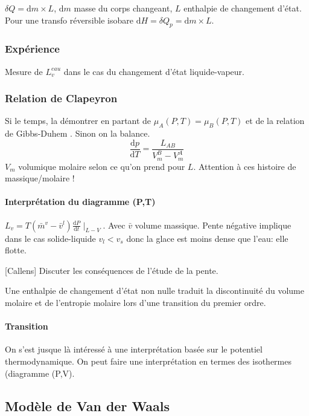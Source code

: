 \documentclass[11pt]{report}
\numberwithin{figure}{section}
\numberwithin{equation}{section}
\numberwithin{table}{section}
\newcommand{\ud}{\mathrm{d}}
\newcommand{\1}{\boldsymbol{1}}
\begin{document}
$\delta Q = \ud m \times L$, $\ud m$ masse du corps changeant, $L$ enthalpie de changement d'état. Pour une transfo réversible isobare $\ud H = \delta Q_p = \ud m \times L$.

\subsubsection{Expérience} Mesure de $L_v^{eau}$ dans le cas du changement d'état liquide-vapeur.

\subsubsection{Relation de Clapeyron}

Si le temps, la démontrer en partant de $\mu_A(P,T) = \mu_B(P,T)$ et de la relation de Gibbs-Duhem . Sinon on la balance.
\begin{equation}
\frac{\ud p}{\ud T} = \frac{L_{AB}}{V_m^B - V_m^A}
\end{equation}
$V_m$ volumique molaire selon ce qu'on prend pour $L$. Attention à ces histoire de massique/molaire !

\paragraph{Interprétation du diagramme (P,T)}

$L_v = T (\bar{m}^v - \bar{v}^l) \frac{\ud P}{\ud t}\mid_{L-V}$. Avec $\bar{v}$ volume massique. Pente négative implique dans le cas solide-liquide $v_l < v_s$ donc la glace est moins dense que l'eau: elle flotte.

[Callens] Discuter les conséquences de l'étude de la pente.

Une enthalpie de changement d'état non nulle traduit la discontinuité du volume molaire et de l'entropie molaire lors d'une transition du premier ordre.

\paragraph{Transition} On s'est jusque là intéressé à une interprétation basée sur le potentiel thermodynamique. On peut faire une interprétation en termes des isothermes  (diagramme (P,V).

\subsection{Modèle de Van der Waals}
\end{document}
